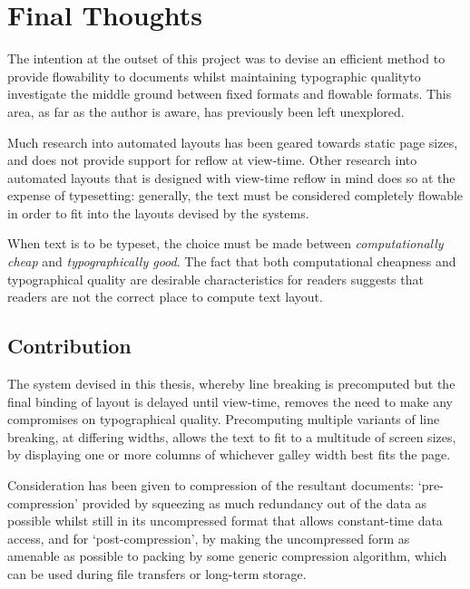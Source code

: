 \chapter{Final Thoughts}\label{ch:conclusions}


The intention at the outset of this project was to devise an efficient method to provide flowability to documents whilst maintaining typographic quality\ed to investigate the middle ground between fixed formats and flowable formats. This area, as far as the author is aware, has previously been left unexplored.

Much research into automated layouts\hspace{0pt}\cite{Johari1996,Goldenberg2002,Purvis2003,Balinsky2009} has been geared towards static page sizes, and does not provide support for reflow at view-time. Other research into automated layouts that is designed with view-time reflow in mind\hspace{0pt}\cite{Jacobs2003,Schrier2008} does so at the expense of typesetting: generally, the text must be considered completely flowable in order to fit into the layouts devised by the systems.

When text is to be typeset, the choice must be made between \emph{computationally cheap} and \emph{typographically good}. The fact that both computational cheapness and typographical quality are desirable characteristics for \ebook{} readers suggests that \ebook{} readers are not the correct place to compute text layout.

\section{Contribution}
The system devised in this thesis, whereby line breaking is precomputed but the final binding of layout is delayed until view-time, removes the need to make any compromises on typographical quality. Precomputing multiple variants of line breaking, at differing widths, allows the text to fit to a multitude of screen sizes, by displaying one or more columns of whichever galley width best fits the page.

Consideration has been given to compression of the resultant documents: `pre-compression' provided by squeezing as much redundancy out of the data as possible whilst still in its uncompressed format that allows constant-time data access, and for `post-compression', by making the uncompressed form as amenable as possible to packing by some generic compression algorithm, which can be used during file transfers or long-term storage.

